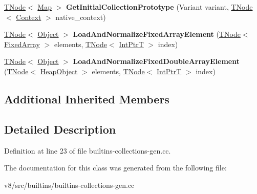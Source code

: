 \begin{DoxyCompactItemize}
\mbox{\label{classv8_1_1internal_1_1BaseCollectionsAssembler_a0d9774779d4d9dc844e4e284c72813ff}} 
\mbox{\hyperlink{classv8_1_1internal_1_1compiler_1_1TNode}{T\+Node}}$<$ \mbox{\hyperlink{classv8_1_1internal_1_1Map}{Map}} $>$ {\bfseries Get\+Initial\+Collection\+Prototype} (Variant variant, \mbox{\hyperlink{classv8_1_1internal_1_1compiler_1_1TNode}{T\+Node}}$<$ \mbox{\hyperlink{classv8_1_1internal_1_1Context}{Context}} $>$ native\+\_\+context)
\item 
\mbox{\label{classv8_1_1internal_1_1BaseCollectionsAssembler_a4b6bb28d831ed8d4e9e95ad9e89ba976}} 
\mbox{\hyperlink{classv8_1_1internal_1_1compiler_1_1TNode}{T\+Node}}$<$ \mbox{\hyperlink{classv8_1_1internal_1_1Object}{Object}} $>$ {\bfseries Load\+And\+Normalize\+Fixed\+Array\+Element} (\mbox{\hyperlink{classv8_1_1internal_1_1compiler_1_1TNode}{T\+Node}}$<$ \mbox{\hyperlink{classv8_1_1internal_1_1FixedArray}{Fixed\+Array}} $>$ elements, \mbox{\hyperlink{classv8_1_1internal_1_1compiler_1_1TNode}{T\+Node}}$<$ \mbox{\hyperlink{structv8_1_1internal_1_1IntPtrT}{Int\+PtrT}} $>$ index)
\item 
\mbox{\label{classv8_1_1internal_1_1BaseCollectionsAssembler_a05eeb24562d10d9065bdd4e5aa59af05}} 
\mbox{\hyperlink{classv8_1_1internal_1_1compiler_1_1TNode}{T\+Node}}$<$ \mbox{\hyperlink{classv8_1_1internal_1_1Object}{Object}} $>$ {\bfseries Load\+And\+Normalize\+Fixed\+Double\+Array\+Element} (\mbox{\hyperlink{classv8_1_1internal_1_1compiler_1_1TNode}{T\+Node}}$<$ \mbox{\hyperlink{classv8_1_1internal_1_1HeapObject}{Heap\+Object}} $>$ elements, \mbox{\hyperlink{classv8_1_1internal_1_1compiler_1_1TNode}{T\+Node}}$<$ \mbox{\hyperlink{structv8_1_1internal_1_1IntPtrT}{Int\+PtrT}} $>$ index)
\end{DoxyCompactItemize}
\subsection*{Additional Inherited Members}


\subsection{Detailed Description}


Definition at line 23 of file builtins-\/collections-\/gen.\+cc.



The documentation for this class was generated from the following file\+:\begin{DoxyCompactItemize}
\item 
v8/src/builtins/builtins-\/collections-\/gen.\+cc\end{DoxyCompactItemize}
